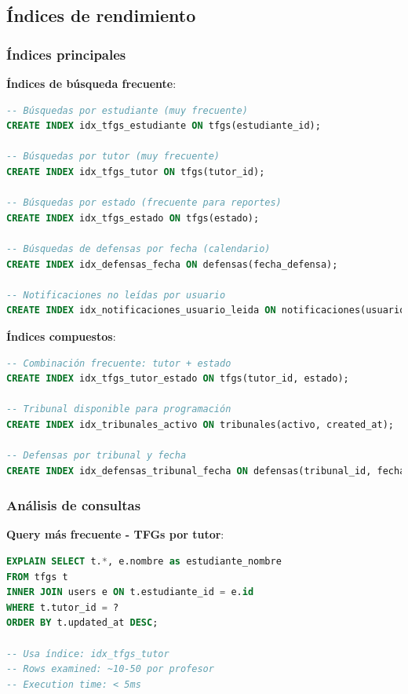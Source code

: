 \documentclass[12pt,a4paper,oneside]{report}
\begin{document}
\subsection{Índices de rendimiento}\label{uxedndices-de-rendimiento}

\subsubsection{Índices principales}\label{uxedndices-principales}

\textbf{Índices de búsqueda frecuente}:

\begin{lstlisting}[language=SQL]
-- Búsquedas por estudiante (muy frecuente)
CREATE INDEX idx_tfgs_estudiante ON tfgs(estudiante_id);

-- Búsquedas por tutor (muy frecuente)  
CREATE INDEX idx_tfgs_tutor ON tfgs(tutor_id);

-- Búsquedas por estado (frecuente para reportes)
CREATE INDEX idx_tfgs_estado ON tfgs(estado);

-- Búsquedas de defensas por fecha (calendario)
CREATE INDEX idx_defensas_fecha ON defensas(fecha_defensa);

-- Notificaciones no leídas por usuario
CREATE INDEX idx_notificaciones_usuario_leida ON notificaciones(usuario_id, leida);
\end{lstlisting}

\textbf{Índices compuestos}:

\begin{lstlisting}[language=SQL]
-- Combinación frecuente: tutor + estado
CREATE INDEX idx_tfgs_tutor_estado ON tfgs(tutor_id, estado);

-- Tribunal disponible para programación
CREATE INDEX idx_tribunales_activo ON tribunales(activo, created_at);

-- Defensas por tribunal y fecha
CREATE INDEX idx_defensas_tribunal_fecha ON defensas(tribunal_id, fecha_defensa);
\end{lstlisting}

\subsubsection{Análisis de consultas}\label{anuxe1lisis-de-consultas}

\textbf{Query más frecuente - TFGs por tutor}:

\begin{lstlisting}[language=SQL]
EXPLAIN SELECT t.*, e.nombre as estudiante_nombre
FROM tfgs t 
INNER JOIN users e ON t.estudiante_id = e.id
WHERE t.tutor_id = ? 
ORDER BY t.updated_at DESC;

-- Usa índice: idx_tfgs_tutor
-- Rows examined: ~10-50 por profesor
-- Execution time: < 5ms
\end{lstlisting}
\end{document}
